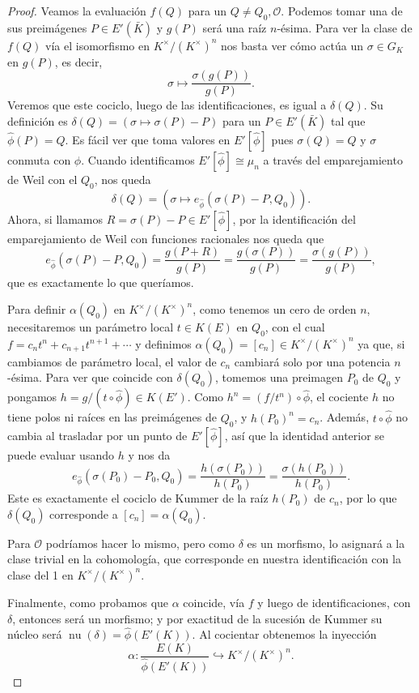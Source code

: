 \documentclass[a4paper]{book}
\theoremstyle{definition}
\theoremstyle{plain}
\DeclareMathOperator{\nuc}{nu}
\newcommand{\OO}{\mathcal{O}}
\newcommand{\KmodN}{K^\times/{(K^\times)}^n}
\begin{document}
\begin{proof}
Veamos la evaluación $f(Q)$ para un $Q \neq Q_0,\OO$. Podemos tomar una de sus preimágenes $P\in E'(\bar{K})$ y $g(P)$ será una raíz $n$-ésima. Para ver la clase de $f(Q)$ vía el isomorfismo en $\KmodN$ nos basta ver cómo actúa un $\sigma \in G_K$ en $g(P)$, es decir, 
\[
\sigma \mapsto \frac{\sigma(g(P))}{g(P)}.
\]
Veremos que este cociclo, luego de las identificaciones, es igual a $\delta(Q)$. Su definición es $\delta(Q) = (\sigma \mapsto \sigma(P)-P)$ para un $P\in E'(\bar{K})$ tal que $\hat\phi(P)=Q$. Es fácil ver que toma valores en $E'[\hat\phi]$ pues $\sigma(Q) = Q$ y $\sigma$ conmuta con $\hat\phi$. Cuando identificamos $E'[\hat\phi]\cong \mu_n$ a través del emparejamiento de Weil con el $Q_0$, nos queda 
\[
\delta(Q) = (\sigma \mapsto e_{\hat\phi}(\sigma(P)-P,Q_0)).
\]
Ahora, si llamamos $R=\sigma(P)-P \in E'[\hat\phi]$, por la identificación del emparejamiento de Weil con funciones racionales nos queda que 
\[
e_{\hat\phi}(\sigma(P)-P, Q_0) = \frac{g(P+R)}{g(P)} = \frac{g(\sigma(P))}{g(P)} = \frac{\sigma(g(P))}{g(P)},
\]
que es exactamente lo que queríamos. 

Para definir $\alpha(Q_0)$ en $\KmodN$, como tenemos un cero de orden $n$, necesitaremos un parámetro local $t\in K(E)$ en $Q_0$, con el cual $f=c_n t^n + c_{n+1}t^{n+1}+\cdots$ y definimos $\alpha(Q_0) = [c_n] \in \KmodN$ ya que, si cambiamos de parámetro local, el valor de $c_n$ cambiará solo por una potencia $n$-ésima. Para ver que coincide con $\delta(Q_0)$, tomemos una preimagen $P_0$ de $Q_0$ y pongamos $h=g/(t\circ\hat\phi)\in K(E')$. Como $h^n=(f/t^n)\circ\hat\phi$, el cociente $h$ no tiene polos ni raíces en las preimágenes de $Q_0$, y ${h(P_0)}^n=c_n$. Además, $t\circ\hat\phi$ no cambia al trasladar por un punto de $E'[\hat\phi]$, así que la identidad anterior se puede evaluar usando $h$ y nos da
\[
e_{\hat\phi}(\sigma(P_0)-P_0,Q_0)
=\frac{h(\sigma(P_0))}{h(P_0)}
=\frac{\sigma(h(P_0))}{h(P_0)}.
\]
Este es exactamente el cociclo de Kummer de la raíz $h(P_0)$ de $c_n$, por lo que $\delta(Q_0)$ corresponde a $[c_n]=\alpha(Q_0)$.

Para $\OO$ podríamos hacer lo mismo, pero como $\delta$ es un morfismo, lo asignará a la clase trivial en la cohomología, que corresponde en nuestra identificación con la clase del 1 en $\KmodN$.

Finalmente, como probamos que $\alpha$ coincide, vía $f$ y luego de identificaciones, con $\delta$, entonces será un morfismo; y por exactitud de la sucesión de Kummer su núcleo será $\nuc (\delta)=\hat\phi(E'(K))$. Al cocientar obtenemos la inyección
\[
\alpha:\frac{E(K)}{\hat\phi(E'(K))} \hookrightarrow \KmodN.
\]
\end{proof}
\end{document}
